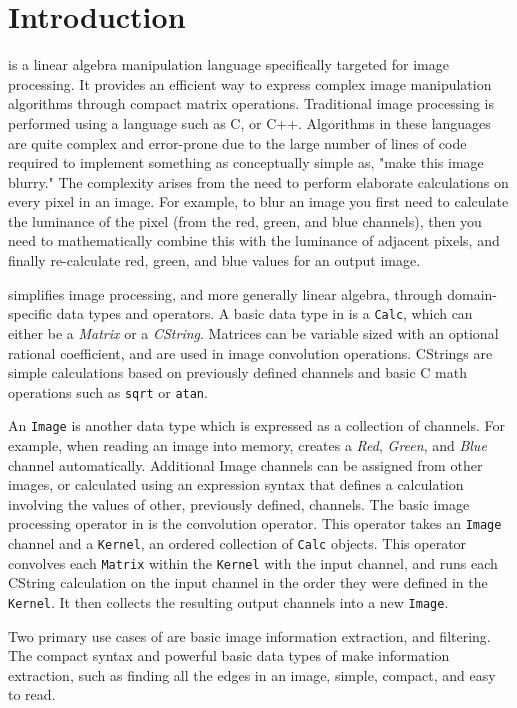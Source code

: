 \chapter{Introduction}

\sys{} is a linear algebra manipulation language specifically targeted for
image processing. It provides an efficient way to express complex image
manipulation algorithms through compact matrix operations. Traditional image
processing is performed using a language such as C, or C++. Algorithms in these
languages are quite complex and error-prone due to the large number of lines of
code required to implement something as conceptually simple as, "make this image
blurry." The complexity arises from the need to perform elaborate calculations
on every pixel in an image. For example, to blur an image you first need to
calculate the luminance of the pixel (from the red, green, and blue channels),
then you need to mathematically combine this with the luminance of adjacent pixels,
and finally re-calculate red, green, and blue values for an output image.

\sys{} simplifies image processing, and more generally linear algebra, through
domain-specific data types and operators. A basic data type in \sys{} is a
\texttt{Calc}, which can either be a \emph{Matrix} or a \emph{CString}.
Matrices can be variable sized with an optional rational coefficient, and are
used in image convolution operations. CStrings are simple calculations
based on previously defined channels and basic C math operations such as \texttt{sqrt}
or \texttt{atan}.

An \texttt{Image} is another \sys{} data type which is expressed as a collection
of channels. For example, when reading an image into memory, \sys{} creates a
\emph{Red}, \emph{Green}, and \emph{Blue} channel automatically. Additional
Image channels can be assigned from other images, or calculated
using an expression syntax that defines a calculation involving the
values of other, previously defined, channels. The basic image processing operator
in \sys{} is the convolution operator. This operator takes an \texttt{Image} channel and a
\texttt{Kernel}, an ordered collection of \texttt{Calc} objects. This
operator convolves each \texttt{Matrix} within the \texttt{Kernel} with the input channel,
and runs each CString calculation on the input channel in the order they were defined in
the \texttt{Kernel}. It then collects the resulting output channels into a new \texttt{Image}.

Two primary use cases of \sys{} are basic image information extraction, and
filtering. The compact syntax and powerful basic data types of \sys{} make
information extraction, such as finding all the edges in an image, simple, compact,
and easy to read.

